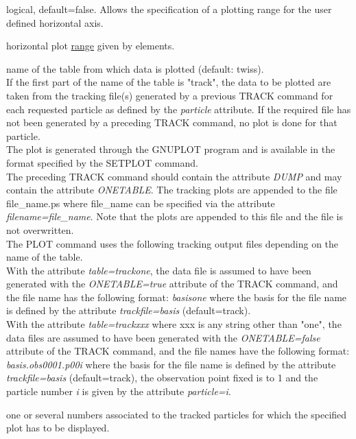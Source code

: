 \begin{madlist}
    logical, default=false. Allows the specification
     of a plotting range for the user defined horizontal axis.   

    horizontal plot
     \href{../Introduction/ranges.html}{range} given by elements.  

    name of the table from which data is plotted (default:
     twiss). \\ 
     If the first part of the name of the table is "track", the
     data to be plotted are taken from the tracking file(s) generated by
     a previous TRACK command for each requested particle as defined by
     the \textit{particle} attribute. If the required file has not been
     generated by a preceding TRACK command, no plot is done for that
     particle. \\  
     The plot is generated through the GNUPLOT program and is available
     in the format specified by the SETPLOT command. \\ 
     The preceding TRACK command should contain the attribute \textit{DUMP}
     and may contain the attribute \textit{ONETABLE}. The tracking plots
     are appended to the file file\_name.ps where file\_name can be
     specified via the attribute \textit{filename=file\_name}. Note that
     the plots are appended to this file and the file is not
     overwritten. \\
     The PLOT command uses the following tracking output files depending on
     the name of the table.\\  
     With the attribute \textit{table=trackone}, the data file is assumed
     to have been generated with the \textit{ONETABLE=true} attribute of
     the TRACK command, and the file name has the following format: 
     \textit{basisone} where the basis for the file name is defined by the
     attribute \textit{trackfile=basis} (default=track).\\
     With the attribute \textit{table=trackxxx} where xxx is any string
     other than "one", the data files are assumed to have been generated
     with the \textit{ONETABLE=false} attribute of the TRACK command, and
     the file names have the following format: \textit{basis.obs0001.p00i}
     where the basis for the file name is defined by the attribute
     \textit{trackfile=basis} (default=track), the observation point fixed
     is to 1 and the particle number \textit{i} is given by the attribute
     \textit{particle=i}.
 
    one or several numbers associated to the tracked
     particles for which the specified plot has to be displayed.  


\end{madlist}
